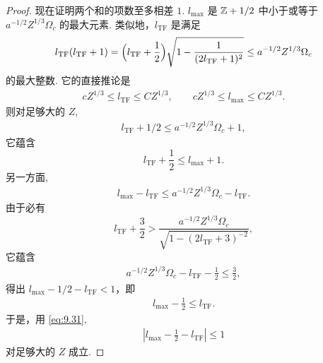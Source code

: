 \begin{proof}
现在证明两个和的项数至多相差 $1$. $l_{\max}$ 是 $\mathbb{Z} + 1/2$ 中小于或等于 $a^{-1/2}Z^{1/3}\Omega_c$ 的最大元素. 类似地，$l_{\mathrm{TF}}$ 是满足
\begin{equation}\label{eq:9.31}
  l_{\mathrm{TF}}(l_{\mathrm{TF}}+1)
  =\Bigl(l_{\mathrm{TF}}+\frac{1}{2}\Bigr)\sqrt{1-\frac{1}{(2l_{\mathrm{TF}}+1)^{2}}}
  \leq a^{-1/2}Z^{1/3}\Omega_{c}
\end{equation}
的最大整数. 它的直接推论是
\begin{align*}
  c Z^{1/3}\leq l_{\mathrm{TF}}\leq C Z^{1/3},\qquad
  c Z^{1/3}\leq l_{\max}\leq C Z^{1/3}.
\end{align*}
则对足够大的 $Z$,
\begin{align*}
  l_{\mathrm{TF}}+1/2\leq a^{-1/2}Z^{1/3}\Omega_{c}+1,
\end{align*}
它蕴含
\begin{equation}\label{eq:9.32}
  l_{\mathrm{TF}}+\frac{1}{2}\leq l_{\max}+1.
\end{equation}
另一方面,
\begin{align*}
  l_{\max}-l_{\mathrm{TF}}\leq a^{-1/2}Z^{1/3}\Omega_{c}-l_{\mathrm{TF}}.
\end{align*}
由于必有
\begin{equation}\label{eq:9.33}
  l_{\mathrm{TF}}+\frac{3}{2}>\frac{a^{-1/2}Z^{1/3}\Omega_{c}}{\sqrt{1-(2l_{\mathrm{TF}}+3)^{-2}}},
\end{equation}
它蕴含
\begin{align*}
  a^{-1/2}Z^{1/3}\Omega_{c}-l_{\mathrm{TF}}-\frac{1}{2}\leq\frac{3}{2},
\end{align*}
得出 $l_{\max} - 1/2 - l_{\mathrm{TF}} < 1$，即
\begin{align*}
  l_{\max}-\frac{1}{2}\leq l_{\mathrm{TF}}.
\end{align*}
于是，用 \eqref{eq:9.31},
\begin{align*}
  \left|l_{\max}-\frac{1}{2}-l_{\mathrm{TF}}\right|\leq 1
\end{align*}
对足够大的 $Z$ 成立.


\end{proof}
